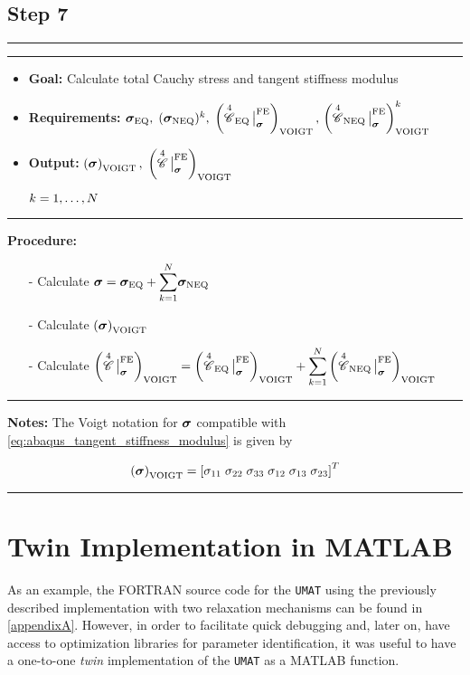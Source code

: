 \subsection*{Step 7}
\vspace{0.1cm}
\hrule
\vspace{0.1cm}
\hrule
\begin{itemize}
    \item \textbf{Goal:} Calculate total Cauchy stress and tangent stiffness modulus
    \item \textbf{Requirements:} \({\bm{\sigma}_{\text{EQ}}},\; 
    ({\bm{\sigma}_{\text{NEQ}}})^{k},\; 
    \left({{\overset{4}{\mathscr{C}}}_{\text{EQ}}}{\,\big|}^{\text{FE}}_{\bm{\sigma}}\right)_{\text{VOIGT}},\,
     \left({{\overset{4}{\mathscr{C}}}_{\text{NEQ}}}{\,\big|}^{\text{FE}}_{\bm{\sigma}}\right)_{\text{VOIGT}}^{k}\)
    \item \textbf{Output:} \(\left({\bm{\sigma}}\right)_{\text{VOIGT}},\; \left({\overset{4}{\mathscr{C}}}{\,\big|}^{\text{FE}}_{\bm{\sigma}}\right)_{\text{VOIGT}}\) 
    \item[] \(\hfill k=1,\ldots,N \)
\end{itemize}
\vspace{0.1cm}
\hrule
\textbf{Procedure:}
\begin{itemize}
    \item[-] Calculate \(\bm{\sigma} = \bm{\sigma}_{\text{EQ}} + {\displaystyle \sum_{k=1}^{N}} \bm{\sigma}_{\text{NEQ}} \)
    \item[-] Calculate \(\left({\bm{\sigma}}\right)_{\text{VOIGT}}\)
    \item[-] Calculate \(\left({\overset{4}{\mathscr{C}}}{\,\big|}^{\text{FE}}_{\bm{\sigma}} \right)_{\text{VOIGT}} = \left({{\overset{4}{\mathscr{C}}}_{\text{EQ}}}{\,\big|}^{\text{FE}}_{\bm{\sigma}}\right)_{\text{VOIGT}} + 
    {\displaystyle \sum_{k=1}^{N}} \left({{\overset{4}{\mathscr{C}}}_{\text{NEQ}}}{\,\big|}^{\text{FE}}_{\bm{\sigma}}\right)_{\text{VOIGT}}\)  
\end{itemize}
\vspace{0.1cm}
\hrule
\textbf{Notes:} \newline
The Voigt notation for \(\bm{\sigma}\) compatible with \cref{eq:abaqus_tangent_stiffness_modulus} is given by 

\[\left({\bm{\sigma}}\right)_{\text{VOIGT}} = \left[\mathrm{\sigma}_{11} \; \mathrm{\sigma}_{22}\; \mathrm{\sigma}_{33}\; \mathrm{\sigma}_{12}\; \mathrm{\sigma}_{13} \; \mathrm{\sigma}_{23} \right]^{T}\]
\vspace{0.1cm}
\hrule
\vspace{0.8cm}



\section{Twin Implementation in MATLAB}
\label{sec:twin_model}
As an example, the FORTRAN source code for the \texttt{UMAT} using the previously described implementation with two relaxation mechanisms can be found in \cref{appendixA}. However, in order to facilitate quick debugging and, later on, have access to optimization libraries for parameter identification, it was useful to have a one-to-one \emph{twin} implementation of the \texttt{UMAT} as a MATLAB function. 

